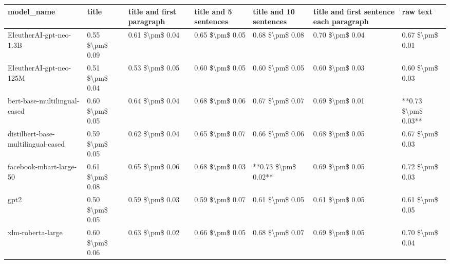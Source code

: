 \begin{tabular}{lllllll}
\toprule
                        model\_name &           title & title and first paragraph & title and 5 sentences & title and 10 sentences & title and first sentence each paragraph &            raw text \\
\midrule
           EleutherAI-gpt-neo-1.3B & 0.55 \$\textbackslash pm\$ 0.09 &           0.61 \$\textbackslash pm\$ 0.04 &       0.65 \$\textbackslash pm\$ 0.05 &        0.68 \$\textbackslash pm\$ 0.08 &                         0.70 \$\textbackslash pm\$ 0.04 &     0.67 \$\textbackslash pm\$ 0.01 \\
           EleutherAI-gpt-neo-125M & 0.51 \$\textbackslash pm\$ 0.04 &           0.53 \$\textbackslash pm\$ 0.05 &       0.60 \$\textbackslash pm\$ 0.05 &        0.60 \$\textbackslash pm\$ 0.05 &                         0.60 \$\textbackslash pm\$ 0.03 &     0.60 \$\textbackslash pm\$ 0.03 \\
      bert-base-multilingual-cased & 0.60 \$\textbackslash pm\$ 0.05 &           0.64 \$\textbackslash pm\$ 0.04 &       0.68 \$\textbackslash pm\$ 0.06 &        0.67 \$\textbackslash pm\$ 0.07 &                         0.69 \$\textbackslash pm\$ 0.01 & **0.73 \$\textbackslash pm\$ 0.03** \\
distilbert-base-multilingual-cased & 0.59 \$\textbackslash pm\$ 0.05 &           0.62 \$\textbackslash pm\$ 0.04 &       0.65 \$\textbackslash pm\$ 0.07 &        0.66 \$\textbackslash pm\$ 0.06 &                         0.68 \$\textbackslash pm\$ 0.05 &     0.67 \$\textbackslash pm\$ 0.03 \\
           facebook-mbart-large-50 & 0.61 \$\textbackslash pm\$ 0.08 &           0.65 \$\textbackslash pm\$ 0.06 &       0.68 \$\textbackslash pm\$ 0.03 &    **0.73 \$\textbackslash pm\$ 0.02** &                         0.69 \$\textbackslash pm\$ 0.05 &     0.72 \$\textbackslash pm\$ 0.03 \\
                              gpt2 & 0.50 \$\textbackslash pm\$ 0.05 &           0.59 \$\textbackslash pm\$ 0.03 &       0.59 \$\textbackslash pm\$ 0.07 &        0.61 \$\textbackslash pm\$ 0.05 &                         0.61 \$\textbackslash pm\$ 0.05 &     0.61 \$\textbackslash pm\$ 0.05 \\
                 xlm-roberta-large & 0.60 \$\textbackslash pm\$ 0.06 &           0.63 \$\textbackslash pm\$ 0.02 &       0.66 \$\textbackslash pm\$ 0.05 &        0.68 \$\textbackslash pm\$ 0.07 &                         0.69 \$\textbackslash pm\$ 0.05 &     0.70 \$\textbackslash pm\$ 0.04 \\
\bottomrule
\end{tabular}
